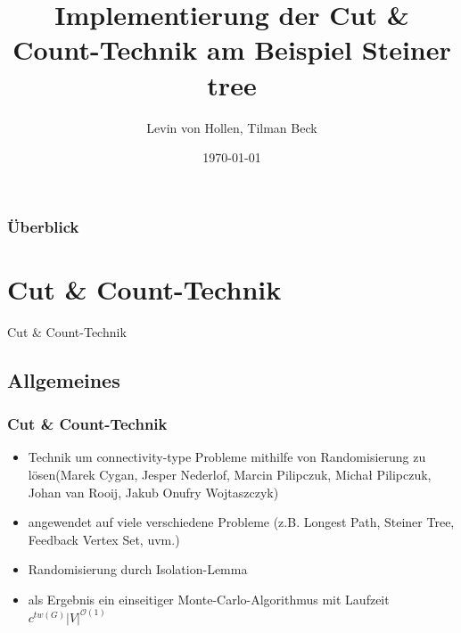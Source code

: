 \documentclass{beamer}
\title[Cut \& Count]{Implementierung der Cut \& Count-Technik am Beispiel Steiner tree} %
\author{
Levin von Hollen, 
Tilman Beck
}
\institute[] %
{
\textit{ \{stu127560-, stu127568-\}@informatik.uni-kiel.de} \\
\medskip
Christian-Albrechts Universität Kiel  %
}
\date{\today} %
\begin{document}
\begin{frame}
\titlepage %
\end{frame}

\begin{frame}
\frametitle{Überblick} %
\tableofcontents %
\end{frame}

\section{Cut \& Count-Technik} %

\begin{frame}
\Huge{\centerline{Cut \& Count-Technik}}
\end{frame}


\subsection{Allgemeines}
\begin{frame}
\frametitle{Cut \& Count-Technik}
\begin{itemize}
\pause
\item Technik um connectivity-type Probleme mithilfe von Randomisierung zu lösen(Marek Cygan, Jesper Nederlof, Marcin Pilipczuk, Michał Pilipczuk, Johan van Rooij, Jakub Onufry Wojtaszczyk)
\pause
\item angewendet auf viele verschiedene Probleme (z.B. Longest Path, Steiner Tree, Feedback Vertex Set, uvm.)
\pause
\item Randomisierung durch Isolation-Lemma 
\pause
\item als Ergebnis ein einseitiger Monte-Carlo-Algorithmus mit Laufzeit $c^{tw(G)} |V|^{\mathcal{O}(1)}$
\end{itemize}
\end{frame}
\end{document}
